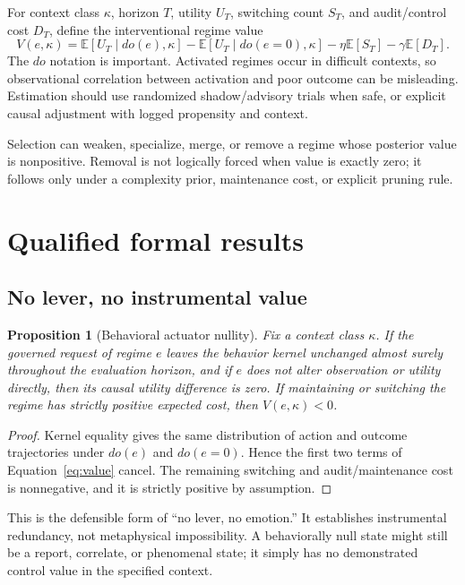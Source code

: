\documentclass[11pt]{article}
\newtheorem{proposition}{Proposition}
\newcommand{\E}{\mathbb{E}}
\begin{document}
For context class $\kappa$, horizon $T$, utility $U_T$, switching count $S_T$,
and audit/control cost $D_T$, define the interventional regime value
\begin{equation}
V(e,\kappa)=
\E[U_T\mid do(e),\kappa]-\E[U_T\mid do(e\!=\!0),\kappa]
-\eta\E[S_T]-\gamma\E[D_T].
\label{eq:value}
\end{equation}
The $do$ notation is important.  Activated regimes occur in difficult contexts,
so observational correlation between activation and poor outcome can be
misleading.  Estimation should use randomized shadow/advisory trials when safe,
or explicit causal adjustment with logged propensity and context.

Selection can weaken, specialize, merge, or remove a regime whose posterior
value is nonpositive.  Removal is not logically forced when value is exactly
zero; it follows only under a complexity prior, maintenance cost, or explicit
pruning rule.

\section{Qualified formal results}

\subsection{No lever, no instrumental value}

\begin{proposition}[Behavioral actuator nullity]
\label{prop:nullity}
Fix a context class $\kappa$.  If the governed request of regime $e$ leaves the
behavior kernel unchanged almost surely throughout the evaluation horizon, and
if $e$ does not alter observation or utility directly, then its causal utility
difference is zero.  If maintaining or switching the regime has strictly
positive expected cost, then $V(e,\kappa)<0$.
\end{proposition}

\begin{proof}
Kernel equality gives the same distribution of action and outcome trajectories
under $do(e)$ and $do(e=0)$.  Hence the first two terms of
Equation~\ref{eq:value} cancel.  The remaining switching and audit/maintenance
cost is nonnegative, and it is strictly positive by assumption.
\end{proof}

This is the defensible form of ``no lever, no emotion.''  It establishes
instrumental redundancy, not metaphysical impossibility.  A behaviorally null
state might still be a report, correlate, or phenomenal state; it simply has no
demonstrated control value in the specified context.
\end{document}
